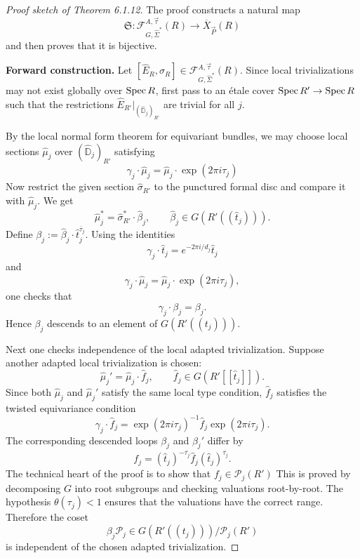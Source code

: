 \documentclass[12pt]{article}
\begin{document}
\begin{proof}[Proof sketch of Theorem 6.1.12]
The proof constructs a natural map
\[
\mathfrak S:
\mathcal F^{A,\vec\tau}_{G,\widehat\Sigma^*}(R)
\longrightarrow
\overline X_{\vec P}(R)
\]
and then proves that it is bijective.

\medskip

\noindent\textbf{Forward construction.}
Let $[\widehat E_R,\widehat\sigma_R]\in \mathcal F^{A,\vec\tau}_{G,\widehat\Sigma^*}(R)$. Since local trivializations may not exist globally over $\operatorname{Spec} R$, first pass to an étale cover $\operatorname{Spec} R'\to \operatorname{Spec} R$ such that the restrictions $\widehat E_{R'}|_{(\widehat{\mathbb D}_j)_{R'}}$
are trivial for all $j$.

By the local normal form theorem for equivariant bundles, we may choose local sections $\widehat\mu_j$ over $(\widehat{\mathbb D}_j)_{R'}$ satisfying
\[
\gamma_j\cdot \widehat\mu_j
=
\widehat\mu_j\cdot \exp(2\pi i\tau_j)
\]
Now restrict the given section $\widehat\sigma_{R'}$ to the punctured formal disc and compare it with $\widehat\mu_j$. We get
\[
\widehat\mu_j^*
=
\widehat\sigma_{R'}^*\cdot \widehat\beta_j,
\qquad
\widehat\beta_j\in G(R'((\widehat t_j))).
\]
Define $\beta_j:=\widehat\beta_j\cdot \widehat t_j^{\overline\tau_j}$.
Using the identities
\[
\gamma_j\cdot \widehat t_j=e^{-2\pi i/d_j}\widehat t_j
\]
and
\[
\gamma_j\cdot \widehat\mu_j
=
\widehat\mu_j\cdot \exp(2\pi i\tau_j),
\]
one checks that
\[
\gamma_j\cdot \beta_j=\beta_j.
\]
Hence $\beta_j$ descends to an element of $G(R'((t_j)))$.

Next one checks independence of the local adapted trivialization. Suppose another adapted local trivialization is chosen:
\[
\widehat\mu_j'=\widehat\mu_j\cdot \widehat f_j,
\qquad
\widehat f_j\in G(R'[[\widehat t_j]]).
\]
Since both $\widehat\mu_j$ and $\widehat\mu_j'$ satisfy the same local type condition, $\widehat f_j$ satisfies the twisted equivariance condition
\[
\gamma_j\cdot \widehat f_j
=
\exp(2\pi i\tau_j)^{-1}\widehat f_j\exp(2\pi i\tau_j).
\]
The corresponding descended loops $\beta_j$ and $\beta_j'$ differ by
\[
f_j=(\widehat t_j)^{-\overline{\tau_j}}\widehat f_j(\widehat t_j)^{\overline{\tau_j}}.
\]
The technical heart of the proof is to show that $f_j\in \mathcal P_j(R')$
This is proved by decomposing $G$ into root subgroups and checking valuations root-by-root. The hypothesis $\theta(\tau_j)<1$ ensures that the valuations have the correct range. Therefore the coset
\[
\beta_j\mathcal P_j\in G(R'((t_j)))/\mathcal P_j(R')
\]
is independent of the chosen adapted trivialization.


\end{proof}
\end{document}
